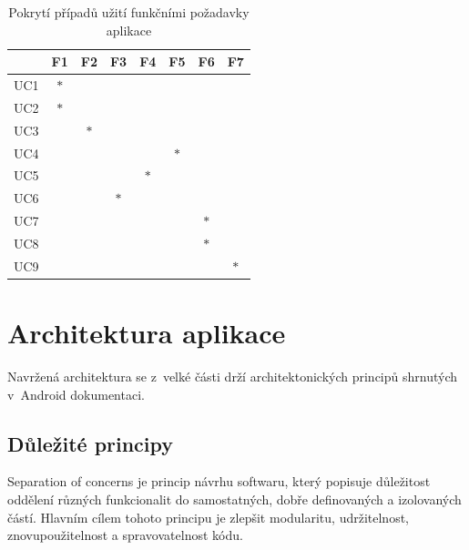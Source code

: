 \begin{table}[H]
  \centering
  \begin{tabular}{|l|c|c|c|c|c|c|c|}
  \hline
       & F1     & F2     & F3     & F4     & F5     & F6     & F7  \\ \hline
  UC1  & $\ast$ &        &        &        &        &        &         \\ \hline
  UC2  & $\ast$ &        &        &        &        &        &         \\ \hline
  UC3  &        & $\ast$ &        &        &        &        &         \\ \hline
  UC4  &        &        &        &        & $\ast$ &        &         \\ \hline
  UC5  &        &        &        & $\ast$ &        &        &         \\ \hline
  UC6  &        &        & $\ast$ &        &        &        &         \\ \hline
  UC7  &        &        &        &        &        & $\ast$ &         \\ \hline
  UC8  &        &        &        &        &        & $\ast$ &         \\ \hline
  UC9  &        &        &        &        &        &        &  $\ast$ \\ \hline
  \end{tabular}
  \caption{Pokrytí případů užití funkčními požadavky aplikace}
  \label{table:tabulkaPokryti}
\end{table}
  

\section{Architektura aplikace}
Navržená architektura se z~velké části drží architektonických principů shrnutých v~Android dokumentaci. \cite{andDocArch}


\subsection*{Důležité principy}

Separation of concerns je princip návrhu softwaru, který popisuje důležitost oddělení různých funkcionalit do samostatných, dobře definovaných a izolovaných částí.
Hlavním cílem tohoto principu je zlepšit modularitu, udržitelnost, znovupoužitelnost a spravovatelnost kódu.

